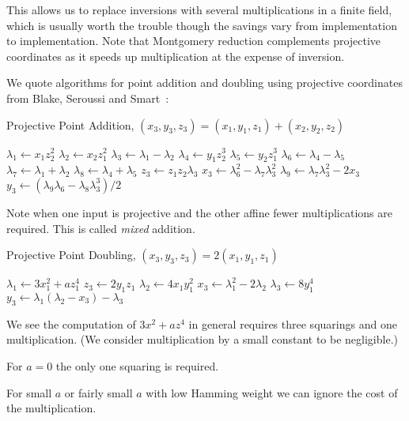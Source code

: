 This allows us to replace inversions with several multiplications in a finite
field, which is usually worth the trouble though the savings
vary from implementation to implementation. Note that Montgomery reduction
complements projective coordinates as it speeds up multiplication at the
expense of inversion.

We quote algorithms for point addition and doubling using projective
coordinates from Blake, Seroussi and Smart~\cite{bss}:

\begin{algorithm}
\caption{Projective Point Addition, $(x_3, y_3, z_3) = (x_1, y_1, z_1) +
(x_2, y_2, z_2)$}
\begin{algorithmic}[1]
\STATE $\lambda_1 \gets x_1 z_2^2$
\STATE $\lambda_2 \gets x_2 z_1^2$
\STATE $\lambda_3 \gets \lambda_1 - \lambda_2$
\STATE $\lambda_4 \gets y_1 z_2^3$
\STATE $\lambda_5 \gets y_2 z_1^3$
\STATE $\lambda_6 \gets \lambda_4 - \lambda_5$
\STATE $\lambda_7 \gets \lambda_1 + \lambda_2$
\STATE $\lambda_8 \gets \lambda_4 + \lambda_5$
\STATE $z_3 \gets z_1 z_2 \lambda_3$
\STATE $x_3 \gets \lambda_6^2 - \lambda_7 \lambda_3^2$
\STATE $\lambda_9 \gets \lambda_7 \lambda_3^2 - 2x_3$
\STATE $y_3 \gets (\lambda_9 \lambda_6 - \lambda_8\lambda_3^3)/2$
\end{algorithmic}
\end{algorithm}

Note when one input is projective and the other affine fewer multiplications
are required. This is called \emph{mixed} addition.

\begin{algorithm}
\caption{Projective Point Doubling, $(x_3, y_3, z_3) = 2(x_1, y_1, z_1)$}
\begin{algorithmic}[1]
\STATE $\lambda_1 \gets 3x_1^2 +a z_1^4$
\STATE $z_3 \gets 2 y_1 z_1$
\STATE $\lambda_2 \gets 4x_1 y_1^2$
\STATE $x_3 \gets \lambda_1^2 - 2\lambda_2$
\STATE $\lambda_3 \gets 8y_1^4$
\STATE $y_3 \gets \lambda_1(\lambda_2 - x_3)-\lambda_3$
\end{algorithmic}
\end{algorithm}

We see the computation of $3x^2 + a z^4$ in general requires three
squarings and one multiplication. (We consider multiplication by
a small constant to be negligible.)

For $a=0$ the only one squaring is required.

For small $a$ or fairly small $a$ with low Hamming weight we can ignore
the cost of the multiplication.

